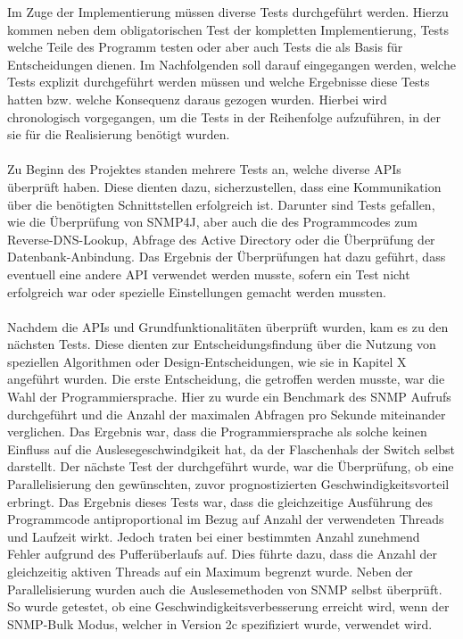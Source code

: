 Im Zuge der Implementierung müssen diverse Tests durchgeführt werden. Hierzu kommen neben dem obligatorischen Test der kompletten Implementierung, Tests welche Teile des Programm testen oder aber auch Tests die als Basis für Entscheidungen dienen.
Im Nachfolgenden soll darauf eingegangen werden, welche Tests explizit durchgeführt werden müssen und welche Ergebnisse diese Tests hatten bzw. welche Konsequenz daraus gezogen wurden. Hierbei wird chronologisch vorgegangen, um die Tests in der Reihenfolge aufzuführen, in der sie für die Realisierung benötigt wurden.\\\\
Zu Beginn des Projektes standen mehrere Tests an, welche diverse APIs überprüft haben. Diese dienten dazu, sicherzustellen, dass eine Kommunikation über die benötigten Schnittstellen erfolgreich ist. Darunter sind Tests gefallen, wie die Überprüfung von SNMP4J, aber auch die des Programmcodes zum Reverse-DNS-Lookup, Abfrage des Active Directory oder die  Überprüfung der Datenbank-Anbindung. Das Ergebnis der Überprüfungen hat dazu geführt, dass eventuell eine andere API verwendet werden musste, sofern ein Test nicht erfolgreich war oder spezielle Einstellungen gemacht werden mussten.\\\\
Nachdem die APIs und Grundfunktionalitäten überprüft wurden, kam es zu den nächsten Tests. Diese dienten zur Entscheidungsfindung über die Nutzung von speziellen Algorithmen oder Design-Entscheidungen, wie sie in Kapitel X angeführt wurden.
Die erste Entscheidung, die getroffen werden musste, war die Wahl der Programmiersprache. Hier zu wurde ein Benchmark des SNMP Aufrufs durchgeführt und die Anzahl der maximalen  Abfragen pro Sekunde miteinander verglichen. Das Ergebnis war, dass die Programmiersprache als solche keinen Einfluss auf die Auslesegeschwindgikeit hat, da der Flaschenhals der Switch selbst darstellt. Der nächste Test der durchgeführt wurde, war die Überprüfung, ob eine Parallelisierung den gewünschten, zuvor prognostizierten Geschwindigkeitsvorteil erbringt. Das Ergebnis dieses Tests war, dass die gleichzeitige Ausführung des Programmcode antiproportional im Bezug auf Anzahl der verwendeten Threads und Laufzeit wirkt. Jedoch traten bei einer bestimmten Anzahl zunehmend Fehler aufgrund des Pufferüberlaufs auf. Dies führte dazu, dass die Anzahl der gleichzeitig aktiven Threads auf ein Maximum begrenzt wurde. Neben der Parallelisierung wurden auch die Auslesemethoden von SNMP selbst überprüft. So wurde getestet, ob eine Geschwindigkeitsverbesserung erreicht wird, wenn der SNMP-Bulk Modus, welcher in Version 2c spezifiziert wurde, verwendet wird.
